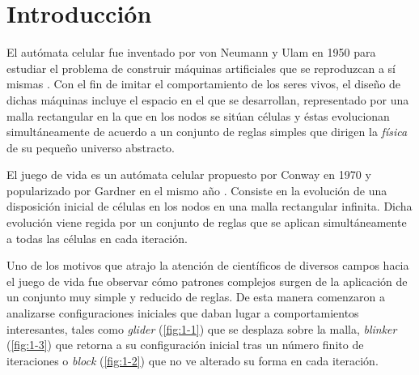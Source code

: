 \documentclass[../proyecto.tex]{book}
\begin{document}
\chapter{Introducción}

El autómata celular fue inventado por von Neumann y Ulam en 1950 para estudiar el problema de construir máquinas artificiales que se reproduzcan a sí mismas \cite{neummanUlam}. Con el fin de imitar el comportamiento de los seres vivos, el diseño de dichas máquinas incluye el espacio en el que se desarrollan, representado por una malla rectangular en la que en los nodos se sitúan células y éstas evolucionan simultáneamente de acuerdo a un conjunto de reglas simples que dirigen la \textit{física} de su pequeño universo abstracto. 

El juego de vida es un autómata celular propuesto por Conway en 1970 y popularizado por Gardner en el mismo año \cite{primerap}. Consiste en la evolución de una disposición inicial de células en los nodos en una malla rectangular infinita. Dicha evolución viene regida por un conjunto de reglas que se aplican simultáneamente a todas las células en cada iteración.

Uno de los motivos que atrajo la atención de científicos de diversos campos hacia el juego de vida fue observar cómo patrones complejos surgen de la aplicación de un conjunto muy simple y reducido de reglas. De esta manera comenzaron a analizarse configuraciones iniciales que daban lugar a comportamientos interesantes, tales como \textit{glider} (\autoref{fig:1-1}) que se desplaza sobre la malla, \textit{blinker} (\autoref{fig:1-3}) que retorna a su configuración inicial tras un número finito de iteraciones o \textit{block} (\autoref{fig:1-2}) que no ve alterado su forma en cada iteración.
\end{document}
